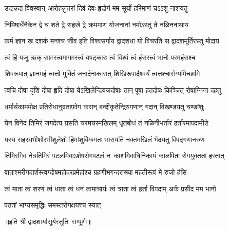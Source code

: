 

\twolineshloka
{उद्यन्नद्य विवस्वान् आरोहन्नुत्तरां दिवं देवः}
{हृद्रोगं मम सूर्यो हरिमाणं चऽऽशु नाशयतु}

\twolineshloka
{निमिषार्धेनैकेन द्वे च शते द्वे सहस्रे द्वे}
{क्रममाण योजनानां नमोऽस्तु ते नळिननाथाय}

\twolineshloka
{कर्म ज्ञान ख दशकं मनश्च जीव इति विश्वसर्गाय}
{द्वादशधा यो विचरति स द्वादशमूर्तिरस्तु मोदाय}

\twolineshloka
{त्वं हि यजू ऋक् सामस्त्वमागमस्त्वं वषट्कारः}
{त्वं विश्वं त्वं हंसस्त्वं भानो परमहंसश्च}

\twolineshloka
{शिवरूपात् ज्ञानमहं त्वत्तो मुक्तिं जनार्दनाकारात्}
{शिखिरूपादैश्वर्यं त्वत्तश्चारोग्यमिच्छामि}

\twolineshloka
{त्वचि दोषा दृशि दोषा हृदि दोषा येऽखिलेन्द्रियजदोषाः}
{तान् पूषा हतदोषः किञ्चित् रोषाग्निना दहतु}

\twolineshloka
{धर्मार्थकाममोक्ष प्रतिरोधानुग्रतापवेग करान्}
{बन्दीकृतेन्द्रियगणान् गदान् विखण्डयतु चण्डांशुः}

\twolineshloka
{येन विनेदं तिमिरं जगदेत्य ग्रसति चरमचरमखिलम्}
{धृतबोधं तं नळिनीभर्तारं हर्तारमापदामीडे}

\twolineshloka
{यस्य सहस्राभीशोरभीशुलेशो हिमांशुबिम्बगतः}
{भासयति नक्तमखिलं भेदयतु विपद्गणानरुणः}

\twolineshloka
{तिमिरमिव नेत्रतिमिरं पटलमिवाऽशेषरोगपटलं नः}
{काशमिवाधिनिकायं कालपिता रोगयुक्ततां हरतात्}

\twolineshloka
{वाताश्मरीगदार्शस्त्वग्दोषमहोदरप्रमेहांश्च}
{ग्रहणीभगन्दराख्या महतीस्त्वं मे रुजो हंसि}

\twolineshloka
{त्वं माता त्वं शरणं त्वं धाता त्वं धनं त्वमाचार्यः}
{त्वं त्राता त्वं हर्ता विपदाम् अर्क प्रसीद मम भानो}

{पठतां भाग्यसमृद्धिः समस्तरोगक्षयश्च स्यात्}

॥इति श्री द्वादशार्यासूर्यस्तुतिः सम्पूर्णः॥